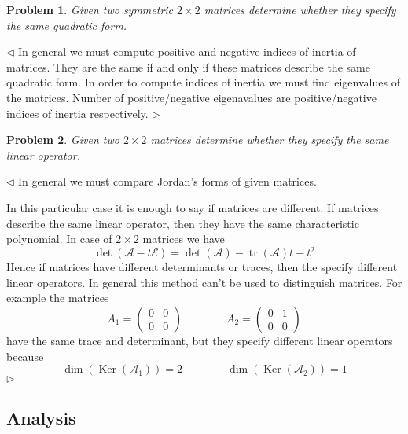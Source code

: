 \documentclass[12pt]{article}
\newtheorem{problem}{Problem}[subsection]
\newenvironment{solution}{\par $\triangleleft$}{$\triangleright$}
\begin{document}
\begin{problem} Given two symmetric $2\times 2$ matrices determine whether they
specify the same quadratic form.
\end{problem}
\begin{solution} In general we must compute positive and negative indices of
    inertia of matrices. They are the same if and only if these matrices
    describe the same quadratic form. In order to compute indices of inertia we
    must find eigenvalues of the matrices. Number of positive/negative
    eigenavalues are positive/negative indices of inertia respectively.
\end{solution}

\begin{problem} Given two $2\times 2$ matrices determine whether they specify
the same linear operator.
\end{problem}
\begin{solution} In general we must compare Jordan's forms of given matrices.

    In this particular case it is enough to say if matrices are different. If
    matrices describe the same linear operator, then they have the same
    characteristic polynomial. In case of $2\times 2$ matrices we have
    $$
        \det(\mathcal{A}-t\mathcal{E})
        =\det(\mathcal{A})-\operatorname{tr}(\mathcal{A}) t+t^2
    $$
    Hence if matrices have different determinants or traces, then the specify
    different linear operators. In general this method can't be used to
    distinguish matrices. For example the matrices
    $$
        A_1=\begin{pmatrix}0&0\\0&0\end{pmatrix}\qquad\qquad
        A_2=\begin{pmatrix}0&1\\0&0\end{pmatrix}
    $$
    have the same trace and determinant, but they specify different linear
    operators because
    $$
        \dim(\operatorname{Ker}(\mathcal{A}_1))=2\qquad\qquad
        \dim(\operatorname{Ker}(\mathcal{A}_2))=1
    $$
\end{solution}














\newpage

\subsection{Analysis}
\end{document}
